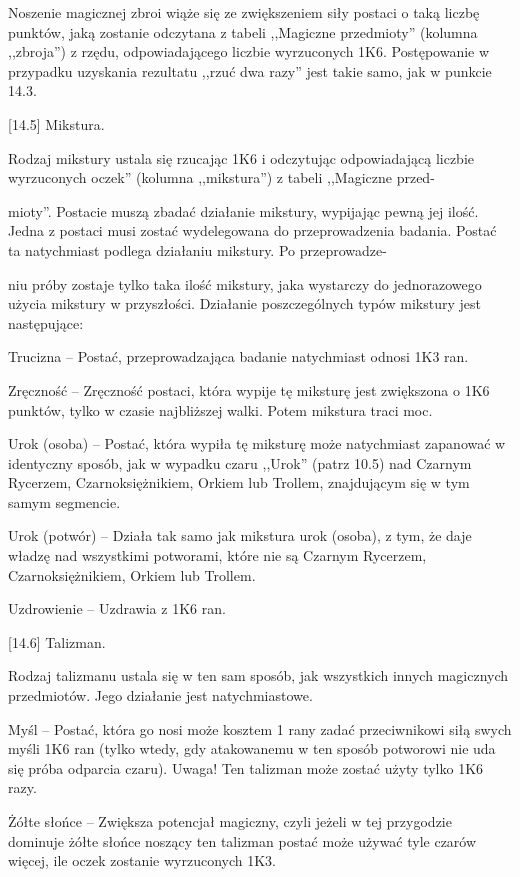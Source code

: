Noszenie magicznej zbroi wiąże się ze zwiększeniem siły postaci o taką liczbę punktów, jaką zostanie odczytana z tabeli ,,Magiczne przedmioty'' (kolumna ,,zbroja'') z rzędu, odpowiadającego liczbie wyrzuconych 1K6.
Postępowanie w przypadku uzyskania rezultatu ,,rzuć dwa razy'' jest takie samo, jak w punkcie 14.3.

[14.5] Mikstura.

Rodzaj mikstury ustala się rzucając 1K6 i odczytując odpowiadającą liczbie wyrzuconych oczek'' (kolumna ,,mikstura'') z tabeli ,,Magiczne przed-

mioty''.
Postacie muszą zbadać działanie mikstury, wypijając pewną jej ilość.
Jedna z postaci musi zostać wydelegowana do przeprowadzenia badania.
Postać ta natychmiast podlega działaniu mikstury.
Po przeprowadze-

niu próby zostaje tylko taka ilość mikstury, jaka wystarczy do jednorazowego użycia mikstury w przyszłości.
Działanie poszczególnych typów mikstury jest następujące:

Trucizna – Postać, przeprowadzająca badanie natychmiast odnosi 1K3 ran.

Zręczność – Zręczność postaci, która wypije tę miksturę jest zwiększona o 1K6 punktów, tylko w czasie najbliższej walki.
Potem mikstura traci moc.

Urok (osoba) – Postać, która wypiła tę miksturę może natychmiast zapanować w identyczny sposób, jak w wypadku czaru ,,Urok'' (patrz 10.5) nad Czarnym Rycerzem, Czarnoksiężnikiem, Orkiem lub Trollem, znajdującym się w tym samym segmencie.

Urok (potwór) – Działa tak samo jak mikstura urok (osoba), z tym, że daje władzę nad wszystkimi potworami, które nie są Czarnym Rycerzem, Czarnoksiężnikiem, Orkiem lub Trollem.

Uzdrowienie – Uzdrawia z 1K6 ran.

[14.6] Talizman.

Rodzaj talizmanu ustala się w ten sam sposób, jak wszystkich innych magicznych przedmiotów.
Jego działanie jest natychmiastowe.

Myśl – Postać, która go nosi może kosztem 1 rany zadać przeciwnikowi siłą swych myśli 1K6 ran (tylko wtedy, gdy atakowanemu w ten sposób potworowi nie uda się próba odparcia czaru).
Uwaga!
Ten talizman może zostać użyty tylko 1K6 razy.

Żółte słońce – Zwiększa potencjał magiczny, czyli jeżeli w tej przygodzie dominuje żółte słońce noszący ten talizman postać może używać tyle czarów więcej, ile oczek zostanie wyrzuconych 1K3.

